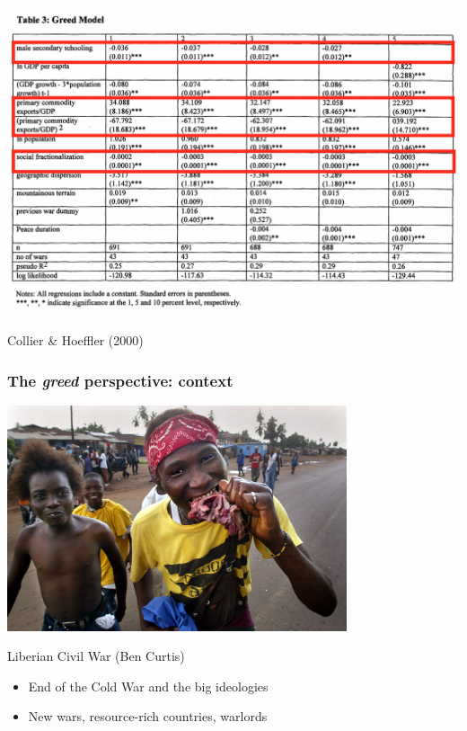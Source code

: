 \documentclass[utf8, xcolor=dvipsnames]{beamer}
\begin{document}
\begin{frame}
\frametitle{}
\centering

\includegraphics[width = \textwidth]{img/collier_hoeffler_model}

{\small Collier \& Hoeffler (2000)}

\end{frame}

\begin{frame}
\frametitle{The \textit{greed} perspective: context}
\centering

\includegraphics[width = 0.75\textwidth]{img/liberia_curtis}

{\footnotesize Liberian Civil War (Ben Curtis)}\\\vspace{10pt}

\begin{itemize}
  \item End of the Cold War and the big ideologies
  \item New wars, resource-rich countries, warlords
\end{itemize}

\end{frame}
\end{document}
